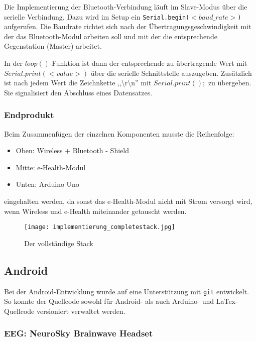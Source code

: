 	Die Implementierung der Bluetooth-Verbindung läuft im Slave-Modus über die serielle Verbindung. Dazu wird im Setup ein \texttt{Serial.begin($<baud\_rate>$)} aufgerufen. Die Baudrate richtet sich nach der Übertragungsgeschwindigkeit mit der das Bluetooth-Modul arbeiten soll und mit der die entsprechende Gegenstation (Master) arbeitet. 
	
	In der $loop()$-Funktion ist dann der entsprechende zu übertragende Wert mit \\$Serial.print(<value>)$ über die serielle Schnittstelle auszugeben. Zusätzlich ist nach jedem Wert die Zeichnkette ,,\textbackslash r\textbackslash n'' mit $Serial.print();$ zu übergeben. Sie signalisiert den Abschluss eines Datensatzes.
	
	
	\subsubsection{Endprodukt}

	Beim Zusammenfügen der einzelnen Komponenten musste die Reihenfolge:
	\begin{itemize}
	\item Oben: Wireless + Bluetooth - Shield
	\item Mitte: e-Health-Modul
	\item Unten: Arduino Uno
	\end{itemize}
	
	eingehalten werden, da sonst das e-Health-Modul nicht mit Strom versorgt wird, wenn Wireless und e-Health miteinander getauscht werden. 
	
	\begin{figure}[hbtp]
	\centering
	\texttt{[image: implementierung\_completestack.jpg]}
	\caption{Der vollständige Stack}
	\label{fig:completeStack}
	\end{figure}
	
	
	\newpage
	\subsection{Android}
	
	Bei der Android-Entwicklung wurde auf eine Unterstützung mit \texttt{git} entwickelt. So konnte der Quellcode sowohl für Android- als auch Arduino- und LaTex-Quellcode versioniert verwaltet werden.
	
	\subsubsection{EEG: NeuroSky Brainwave Headset}
	
